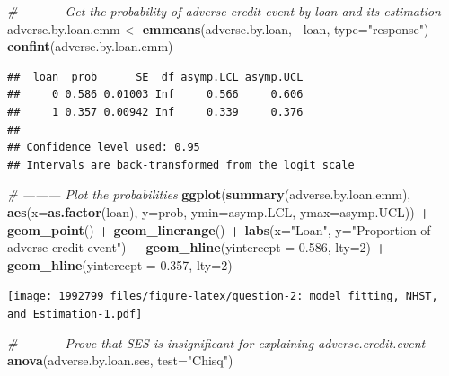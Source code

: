 \documentclass[]{article}
\newenvironment{Shaded}{\begin{snugshade}}{\end{snugshade}}
\newcommand{\CommentTok}[1]{\textcolor[rgb]{0.56,0.35,0.01}{\textit{#1}}}
\newcommand{\DataTypeTok}[1]{\textcolor[rgb]{0.13,0.29,0.53}{#1}}
\newcommand{\DecValTok}[1]{\textcolor[rgb]{0.00,0.00,0.81}{#1}}
\newcommand{\FloatTok}[1]{\textcolor[rgb]{0.00,0.00,0.81}{#1}}
\newcommand{\KeywordTok}[1]{\textcolor[rgb]{0.13,0.29,0.53}{\textbf{#1}}}
\newcommand{\NormalTok}[1]{#1}
\newcommand{\OperatorTok}[1]{\textcolor[rgb]{0.81,0.36,0.00}{\textbf{#1}}}
\newcommand{\StringTok}[1]{\textcolor[rgb]{0.31,0.60,0.02}{#1}}
\begin{document}
\begin{Shaded}
\begin{Highlighting}[]
\CommentTok{# --------- Get the probability of adverse credit event by loan and its estimation}
\NormalTok{adverse.by.loan.emm <-}\StringTok{ }\KeywordTok{emmeans}\NormalTok{(adverse.by.loan, }\OperatorTok{~}\NormalTok{loan, }\DataTypeTok{type=}\StringTok{"response"}\NormalTok{)}
\KeywordTok{confint}\NormalTok{(adverse.by.loan.emm)}
\end{Highlighting}
\end{Shaded}

\begin{verbatim}
##  loan  prob      SE  df asymp.LCL asymp.UCL
##     0 0.586 0.01003 Inf     0.566     0.606
##     1 0.357 0.00942 Inf     0.339     0.376
## 
## Confidence level used: 0.95 
## Intervals are back-transformed from the logit scale
\end{verbatim}

\begin{Shaded}
\begin{Highlighting}[]
\CommentTok{# --------- Plot the probabilities}
\KeywordTok{ggplot}\NormalTok{(}\KeywordTok{summary}\NormalTok{(adverse.by.loan.emm), }\KeywordTok{aes}\NormalTok{(}\DataTypeTok{x=}\KeywordTok{as.factor}\NormalTok{(loan), }\DataTypeTok{y=}\NormalTok{prob, }\DataTypeTok{ymin=}\NormalTok{asymp.LCL, }\DataTypeTok{ymax=}\NormalTok{asymp.UCL)) }\OperatorTok{+}\StringTok{ }\KeywordTok{geom_point}\NormalTok{() }\OperatorTok{+}\StringTok{ }\KeywordTok{geom_linerange}\NormalTok{() }\OperatorTok{+}\StringTok{ }\KeywordTok{labs}\NormalTok{(}\DataTypeTok{x=}\StringTok{"Loan"}\NormalTok{, }\DataTypeTok{y=}\StringTok{"Proportion of adverse credit event"}\NormalTok{)  }\OperatorTok{+}
\StringTok{  }\KeywordTok{geom_hline}\NormalTok{(}\DataTypeTok{yintercept =} \FloatTok{0.586}\NormalTok{, }\DataTypeTok{lty=}\DecValTok{2}\NormalTok{) }\OperatorTok{+}
\StringTok{  }\KeywordTok{geom_hline}\NormalTok{(}\DataTypeTok{yintercept =} \FloatTok{0.357}\NormalTok{, }\DataTypeTok{lty=}\DecValTok{2}\NormalTok{)}
\end{Highlighting}
\end{Shaded}

\texttt{[image: 1992799\_files/figure-latex/question-2: model fitting, NHST, and Estimation-1.pdf]}

\begin{Shaded}
\begin{Highlighting}[]
\CommentTok{# --------- Prove that SES is insignificant for explaining adverse.credit.event}
\KeywordTok{anova}\NormalTok{(adverse.by.loan.ses, }\DataTypeTok{test=}\StringTok{"Chisq"}\NormalTok{)}
\end{Highlighting}
\end{Shaded}
\end{document}
